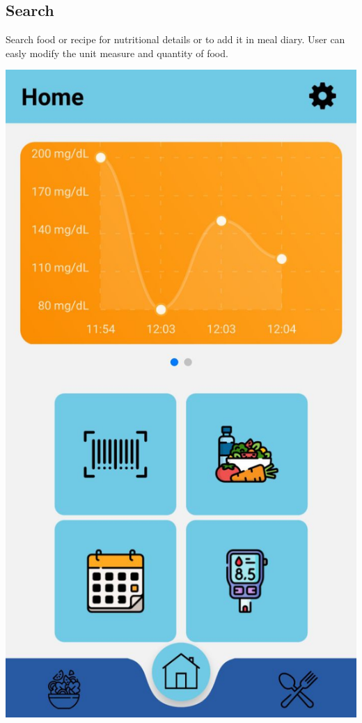 \documentclass[12pt,hidelinks]{article}
\begin{document}
	\subsection{Search}
    Search food or recipe for nutritional details or to add it in meal diary. User can easly modify the unit measure and quantity of food.
	\begin{center}

		\includegraphics[scale=0.2]{screenshot3}
	\end{center}
\end{document}

